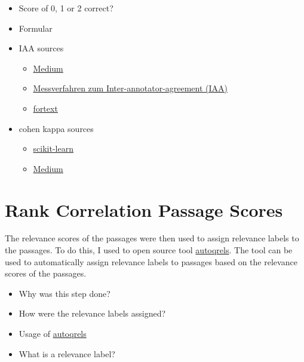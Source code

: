 \begin{itemize}
    \item Score of 0, 1 or 2 correct?
    \item Formular
    \item IAA sources
    \begin{itemize}
        \item \href{https://medium.com/@prasanNH/inter-annotator-agreement-in-natural-language-processing-f65685a22816}{Medium}
        \item \href{https://publications.goettingen-research-online.de/bitstream/2/111141/1/DWP44_Konle-IAA-Metriken.pdf}{Messverfahren zum Inter-annotator-agreement (IAA)}
        \item \href{https://fortext.net/ueber-fortext/glossar/inter-annotator-agreement-iaa}{fortext}
    \end{itemize}
    \item cohen kappa sources
    \begin{itemize}
        \item \href{https://scikit-learn.org/dev/modules/generated/sklearn.metrics.cohen_kappa_score.html}{scikit-learn}
        \item \href{https://surge-ai.medium.com/inter-annotator-agreement-an-introduction-to-cohens-kappa-statistic-dcc15ffa5ac4}{Medium}
    \end{itemize}
\end{itemize}

\section{Rank Correlation Passage Scores}\label{rank-correlation-passage-scores}

The relevance scores of the passages were then used to assign relevance labels to the passages. To do this, I used to open source tool \href{https://github.com/seanmacavaney/autoqrels}{autoqrels}. The tool can be used to automatically assign relevance labels to passages based on the relevance scores of the passages.

\begin{itemize}
    \item Why was this step done?
    \item How were the relevance labels assigned?
    \item Usage of \href{https://github.com/seanmacavaney/autoqrels}{autoqrels}
    \item What is a relevance label?
\end{itemize}

